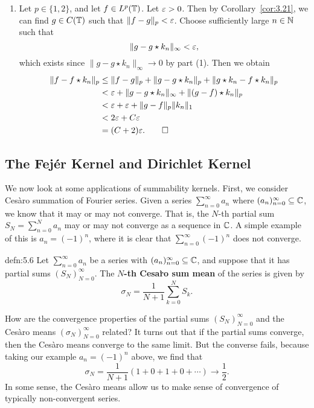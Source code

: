 \begin{pf}
\begin{enumerate}[(1)]
        \item Let $p \in \{1, 2\}$, and let $f \in L^p(\mathbb{T})$. Let $\varepsilon > 0$. Then by 
        Corollary~\ref{cor:3.21}, we can find $g \in C(\mathbb{T})$ such that $\|f - g\|_p < \varepsilon$. 
        Choose sufficiently large $n \in \mathbb{N}$ such that 
        \[ \|g - g \star k_n\|_\infty < \varepsilon, \] 
        which exists since $\|g - g \star k_n\|_\infty \to 0$ by part (1). Then we obtain 
        \begin{align*}
            \|f - f \star k_n\|_p 
            &\leq \|f - g\|_p + \|g - g \star k_n\|_p + \|g \star k_n - f \star k_n\|_p \\ 
            &< \varepsilon + \|g - g \star k_n\|_\infty + \|(g - f) \star k_n\|_p \\ 
            &< \varepsilon + \varepsilon + \|g - f\|_p \|k_n\|_1 \\ 
            &< 2\varepsilon + C\varepsilon \\ 
            &= (C + 2)\varepsilon. \qedhere 
        \end{align*}
    \end{enumerate}
\end{pf}

\subsection{The Fej\'er Kernel and Dirichlet Kernel} \label{subsec:5.3}
We now look at some applications of summability kernels. First, we consider 
Ces\`aro summation of Fourier series. Given a series $\sum_{n=0}^\infty a_n$
where $(a_n)_{n=0}^\infty \subseteq \mathbb{C}$, we know that it may or may not converge. 
That is, the $N$-th partial sum $S_N = \sum_{n=0}^N a_n$ may or may not converge 
as a sequence in $\mathbb{C}$. A simple example of this is $a_n = (-1)^n$, where it is 
clear that $\sum_{n=0}^\infty (-1)^n$ does not converge. 

\begin{defn}{defn:5.6}
    Let $\sum_{n=0}^\infty a_n$ be a series with $(a_n)_{n=0}^\infty \subseteq \mathbb{C}$, 
    and suppose that it has partial sums $(S_N)_{N=0}^\infty$. The 
    {\bf $N$-th Cesa\`ro sum mean} of the series is given by 
    \[ \sigma_N = \frac{1}{N+1} \sum_{k=0}^N S_k. \] 
\end{defn}

How are the convergence properties of the partial sums $(S_N)_{N=0}^\infty$ 
and the Ces\`aro means $(\sigma_N)_{N=0}^\infty$ related? It turns out 
that if the partial sums converge, then the Ces\`aro means converge to the 
same limit. But the converse fails, because taking our example $a_n = (-1)^n$ 
above, we find that 
\[ \sigma_N = \frac{1}{N+1}(1 + 0 + 1 + 0 + \cdots) \to \frac12. \] 
In some sense, the Ces\`aro means allow us to make sense of convergence of 
typically non-convergent series. 

